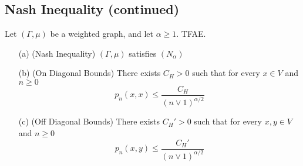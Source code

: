 \documentclass[main]{subfiles}
\begin{document}


\subsection*{Nash Inequality (continued)}
\begin{theorem}
Let $(\Gamma, \mu)$ be a weighted graph, and let $\alpha\ge1$. TFAE.
\begin{itemize}
\item[(a)](Nash Inequality) $(\Gamma, \mu)$ satisfies $(N_{\alpha})$
\item[(b)](On Diagonal Bounds) There exists $C_H>0 $ such that for every $x\in V$ and $n\ge0$ \[p_n(x,x)\le\frac{C_H}{(n\lor 1)^{\alpha/2}}\]
\item[(c)](Off Diagonal Bounds) There exists $C_H'>0 $ such that for every $x,y\in V$ and $n\ge0$ \[p_n(x,y)\le\frac{C_H'}{(n\lor 1)^{\alpha/2}}\]
\end{itemize}
\end{theorem}
\end{document}
